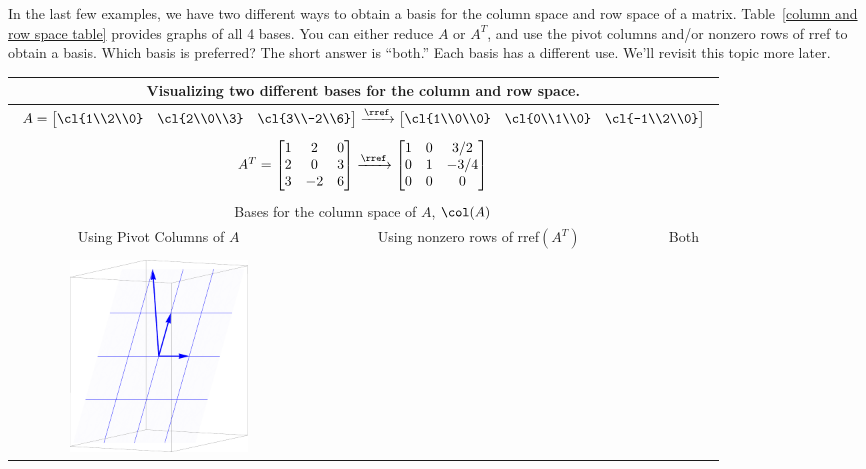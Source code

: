 In the last few examples, we have two different ways to obtain a basis for the column space and row space of a matrix. Table~\ref{column and row space table} provides graphs of all 4 bases. You can either reduce $A$ or $A^T$, and use the pivot columns and/or nonzero rows of rref to obtain a basis. Which basis is preferred?  The short answer is ``both.''  Each basis has a different use.  We'll revisit this topic more later.

\begin{table}

\begin{tabular}{ccc}
\multicolumn{3}{c}{
Visualizing two different bases for the column and row space. 
}
\\\hline
\multicolumn{3}{c}{
$
A=
\begin{bmatrix}
\cl{1\\2\\0}
&\cl{2\\0\\3}
&\cl{3\\-2\\6}
\end{bmatrix}
\xrightarrow{\rref}
\begin{bmatrix}
\cl{1\\0\\0}
&\cl{0\\1\\0}
&\cl{-1\\2\\0}
\end{bmatrix}
$}
\\ \\
\multicolumn{3}{c}{
$
A^T
=
\begin{bmatrix}
 1 & 2 & 0 \\
 2 & 0 & 3 \\
 3 & -2 & 6
\end{bmatrix}
\xrightarrow{\rref}
\begin{bmatrix}
 1 & 0 & {3}/{2} \\
 0 & 1 & -{3}/{4} \\
 0 & 0 & 0
\end{bmatrix}
$
}
\\ \\
\hline\hline \multicolumn{3}{c}{Bases for the column space of $A$, $\col(A)$}\\
\hline Using Pivot Columns of $A$ & Using nonzero rows of rref$(A^T)$ & Both\\ \\
\includegraphics[height=2in]{Applications/support/colspace1}

\end{tabular}
\end{table}
